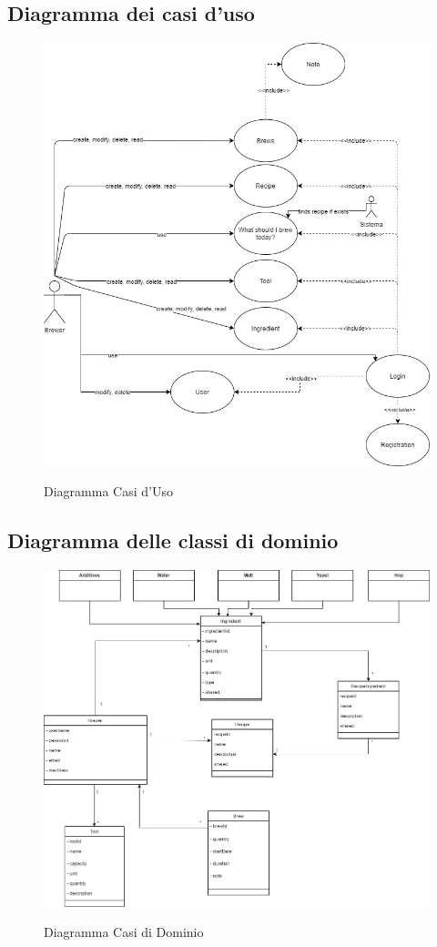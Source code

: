 \documentclass{article}
\begin{document}
\subsection{Diagramma dei casi d'uso}
\begin{figure}[h!]
\centering
\includegraphics[scale=0.5]{Diagramma casi d'uso.png}
\label{fig:Diagramma Casi d'Uso}
\caption{Diagramma Casi d'Uso}
\end{figure}
\clearpage
\subsection{Diagramma delle classi di dominio}
\begin{figure}[h!]
\centering
\includegraphics[scale=0.4]{Diagramma di Dominio.png}
\label{fig:Diagramma Casi di Dominio}
\caption{Diagramma Casi di Dominio}
\end{figure}
\clearpage
\end{document}
